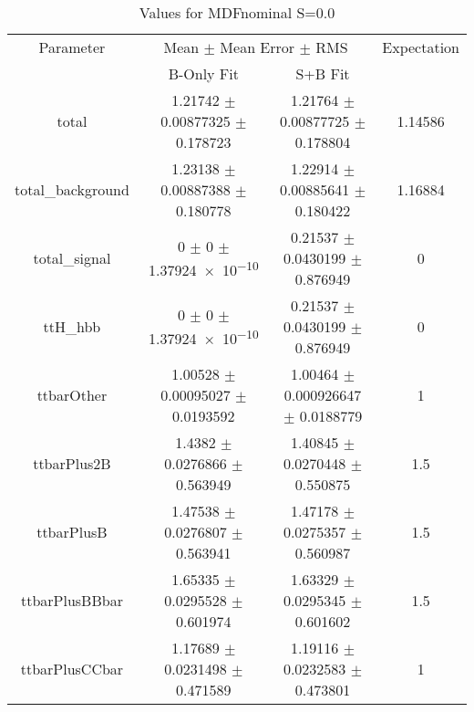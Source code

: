 \begin{table}
\centering
\caption{Values for MDFnominal S=0.0}
\begin{tabular}{cccc}
\toprule
Parameter & \multicolumn{2}{c}{Mean $\pm$ Mean Error $\pm$ RMS} & Expectation\\
 & B-Only Fit & S+B Fit & \\
\midrule
total & \num{1.21742} $\pm$ \num{0.00877325} $\pm$ \num{0.178723} & \num{1.21764} $\pm$ \num{0.00877725} $\pm$ \num{0.178804} & \num{1.14586}\\
total\_background & \num{1.23138} $\pm$ \num{0.00887388} $\pm$ \num{0.180778} & \num{1.22914} $\pm$ \num{0.00885641} $\pm$ \num{0.180422} & \num{1.16884}\\
total\_signal & \num{0} $\pm$ \num{0} $\pm$ \num{1.37924e-10} & \num{0.21537} $\pm$ \num{0.0430199} $\pm$ \num{0.876949} & \num{0}\\
ttH\_hbb & \num{0} $\pm$ \num{0} $\pm$ \num{1.37924e-10} & \num{0.21537} $\pm$ \num{0.0430199} $\pm$ \num{0.876949} & \num{0}\\
ttbarOther & \num{1.00528} $\pm$ \num{0.00095027} $\pm$ \num{0.0193592} & \num{1.00464} $\pm$ \num{0.000926647} $\pm$ \num{0.0188779} & \num{1}\\
ttbarPlus2B & \num{1.4382} $\pm$ \num{0.0276866} $\pm$ \num{0.563949} & \num{1.40845} $\pm$ \num{0.0270448} $\pm$ \num{0.550875} & \num{1.5}\\
ttbarPlusB & \num{1.47538} $\pm$ \num{0.0276807} $\pm$ \num{0.563941} & \num{1.47178} $\pm$ \num{0.0275357} $\pm$ \num{0.560987} & \num{1.5}\\
ttbarPlusBBbar & \num{1.65335} $\pm$ \num{0.0295528} $\pm$ \num{0.601974} & \num{1.63329} $\pm$ \num{0.0295345} $\pm$ \num{0.601602} & \num{1.5}\\
ttbarPlusCCbar & \num{1.17689} $\pm$ \num{0.0231498} $\pm$ \num{0.471589} & \num{1.19116} $\pm$ \num{0.0232583} $\pm$ \num{0.473801} & \num{1}\\
\bottomrule
\end{tabular}
\end{table}